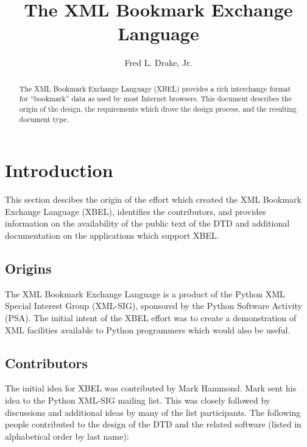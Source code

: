 \documentclass{howto}
\title{The XML Bookmark Exchange Language}
\author{Fred L. Drake, Jr.}
\begin{document}
\maketitle

\begin{abstract}
\noindent
The XML Bookmark Exchange Language (XBEL) provides a rich interchange
format for ``bookmark'' data as used by most Internet browsers.  This
document describes the origin of the design, the requirements which
drove the design process, and the resulting document type.
\end{abstract}

\tableofcontents


\section{Introduction
         \label{intro}}

  This section descibes the origin of the effort which created the XML
  Bookmark Exchange Language (XBEL), identifies the contributors, and
  provides information on the availability of the public text of the
  DTD and additional documentation on the applications which support
  XBEL.

  \subsection{Origins
              \label{origins}}

    The XML Bookmark Exchange Language is a product of the Python XML
    Special Interest Group (XML-SIG), sponsored by the Python Software
    Activity (PSA).  The initial intent of the XBEL effort was to
    create a demonstration of XML facilities available to Python
    programmers which would also be useful.

  \subsection{Contributors
              \label{contrib}}

    The initial idea for XBEL was contributed by Mark Hammond.  Mark
    sent his idea to the Python XML-SIG mailing list.  This was closely
    followed by discussions and additional ideas by many of the list
    participants.  The following people contributed to the design of
    the DTD and the related software (listed in alphabetical order by
    last name):
\end{document}
